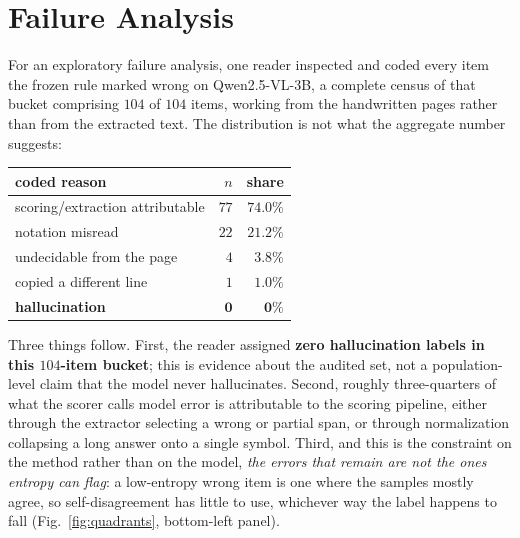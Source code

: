 \documentclass[10pt,twocolumn,letterpaper]{article}
\begin{document}
\section{Failure Analysis}
\label{sec:failures}
%
For an exploratory failure analysis, one reader inspected and coded every
item the frozen rule marked wrong on Qwen2.5-VL-3B, a complete census of that
bucket comprising $104$ of $104$ items, working from the handwritten pages
rather than from the extracted text. The
distribution is not what the aggregate number suggests:

\begin{center}\small
\begin{tabular}{lrr}
\toprule
coded reason & $n$ & share \\
\midrule
scoring/extraction attributable & $77$ & $74.0\%$ \\
notation misread & $22$ & $21.2\%$ \\
undecidable from the page & $4$ & $3.8\%$ \\
copied a different line & $1$ & $1.0\%$ \\
\textbf{hallucination} & $\mathbf{0}$ & $\mathbf{0\%}$ \\
\bottomrule
\end{tabular}
\end{center}

Three things follow. First, the reader assigned \textbf{zero hallucination
labels in this $104$-item bucket}; this is evidence about the audited set,
not a population-level claim that the model never hallucinates.
Second, roughly three-quarters of what the scorer calls model error is
attributable to the scoring pipeline, either through the extractor
selecting a wrong or partial span, or through normalization collapsing a
long answer onto a single symbol. Third, and this is the constraint on the method rather than on
the model, \emph{the errors that remain are not the ones entropy can
  flag}: a low-entropy wrong item is one where the samples mostly agree, so
self-disagreement has little to use, whichever way the label happens to
fall (Fig.~\ref{fig:quadrants}, bottom-left panel).
\end{document}
